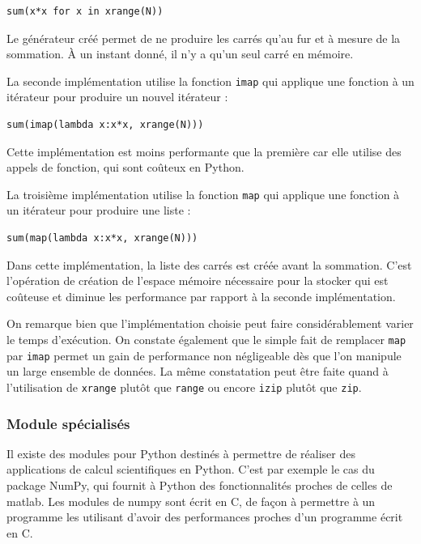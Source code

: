 \documentclass[a4paper]{article}
\begin{document}
\begin{lstlisting}
sum(x*x for x in xrange(N))
\end{lstlisting}

Le générateur créé permet de ne produire les carrés qu'au fur et à
mesure de la sommation. À un instant donné, il n'y a qu'un seul carré
en mémoire.


La seconde implémentation utilise la fonction \texttt{imap} qui applique une
fonction à un itérateur pour produire un nouvel itérateur :

\begin{lstlisting}
sum(imap(lambda x:x*x, xrange(N)))
\end{lstlisting}

Cette implémentation est moins performante que la première car elle
utilise des appels de fonction, qui sont coûteux en Python.


La troisième implémentation utilise la fonction \texttt{map} qui applique une
fonction à un itérateur pour produire une liste :

\begin{lstlisting}
sum(map(lambda x:x*x, xrange(N)))
\end{lstlisting}

Dans cette implémentation, la liste des carrés est créée avant la
sommation. C'est l'opération de création de l'espace mémoire
nécessaire pour la stocker qui est coûteuse et diminue les performance
par rapport à la seconde implémentation.

On remarque bien que l'implémentation choisie peut faire
considérablement varier le temps d'exécution. On constate également
que le simple fait de remplacer \texttt{map} par \texttt{imap} permet un gain de
performance non négligeable dès que l'on manipule un large ensemble de
données. La même constatation peut être faite quand à l'utilisation de
\texttt{xrange} plutôt que \texttt{range} ou encore \texttt{izip} plutôt que \texttt{zip}.

\subsubsection{Module spécialisés}

Il existe des modules pour Python destinés à permettre de réaliser des
applications de calcul scientifiques en Python.  C'est par exemple le
cas du package NumPy, qui fournit à Python des fonctionnalités proches
de celles de matlab. Les modules de numpy sont écrit en C, de façon à
permettre à un programme les utilisant d'avoir des performances
proches d'un programme écrit en C\cite{NumPyPerf}.
\end{document}
